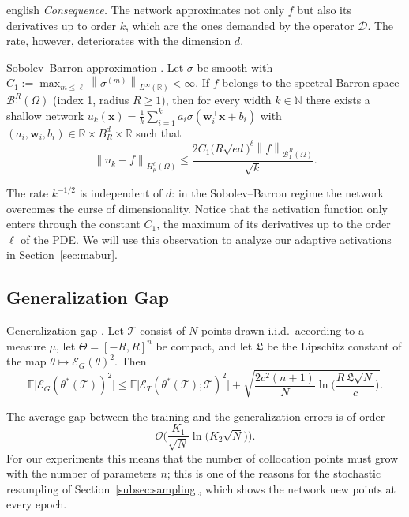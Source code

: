 \documentclass[11pt,letterpaper,twoside,openright]{book} %
\newcommand{\norm}[1]{\left\lVert #1 \right\rVert}
\newcommand{\T}{\mathcal{T}}
\begin{document}
\begin{hyphenrules}{english}
\emph{Consequence.} The network approximates not only $f$ but also its derivatives up to order $k$, which
are the ones demanded by the operator $\mathcal{D}$. The rate, however, deteriorates with the dimension
$d$.

\begin{teorema}{Sobolev--Barron approximation \cite[Theorem~4.33]{deryck2024acta}.}\label{thm:barron}
Let $\sigma$ be smooth with $C_1:=\max_{m\le\ell}\norm{\sigma^{(m)}}_{L^\infty(\mathbb{R})}<\infty$. If $f$
belongs to the spectral Barron space $\mathcal{B}^{R}_{1}(\Omega)$ (index 1, radius $R\ge1$), then for
every width $k\in\mathbb{N}$ there exists a shallow network
$u_k(\mathbf{x})=\frac1k\sum_{i=1}^{k}a_i\sigma(\mathbf{w}_i^{\top}\mathbf{x}+b_i)$ with
$(a_i,\mathbf{w}_i,b_i)\in\mathbb{R}\times B^d_R\times\mathbb{R}$ such that
\[
  \norm{u_k-f}_{H^{\ell}_{\mu}(\Omega)}\le\frac{2C_1\big(R\sqrt{ed}\big)^{\ell}\norm{f}_{\mathcal{B}^R_1(\Omega)}}{\sqrt{k}}.
\]
\end{teorema}

The rate $k^{-1/2}$ is independent of $d$: in the Sobolev--Barron regime the network overcomes the
curse of dimensionality. Notice that the activation function only enters through the constant $C_1$,
the maximum of its derivatives up to the order $\ell$ of the PDE. We will use this observation to
analyze our adaptive activations in Section~\ref{sec:mabur}.

\subsection{Generalization Gap}

\begin{teorema}{Generalization gap \cite[Theorem~6.2]{deryck2022kolmogorov,beck2022}.}\label{thm:generalization}
Let $\T$ consist of $N$ points drawn i.i.d.\ according to a measure $\mu$, let $\Theta=[-R,R]^{n}$ be
compact, and let $\mathfrak{L}$ be the Lipschitz constant of the map $\theta\mapsto\mathcal{E}_G(\theta)^2$.
Then
\[
  \mathbb{E}\big[\mathcal{E}_G(\theta^{*}(\T))^2\big]\le\mathbb{E}\big[\mathcal{E}_T(\theta^{*}(\T);\T)^2\big]
  +\sqrt{\frac{2c^2(n+1)}{N}\ln\Big(\frac{R\,\mathfrak{L}\sqrt{N}}{c}\Big)}.
\]
\end{teorema}

The average gap between the training and the generalization errors is of order
\[
  \mathcal{O}\Big(\frac{K_1}{\sqrt N}\ln\big(K_2\sqrt N\big)\Big).
\] For our experiments this means that the number
of collocation points must grow with the number of parameters $n$; this is one of the reasons for the
stochastic resampling of Section~\ref{subsec:sampling}, which shows the network new points at every epoch.


\end{hyphenrules}
\end{document}
